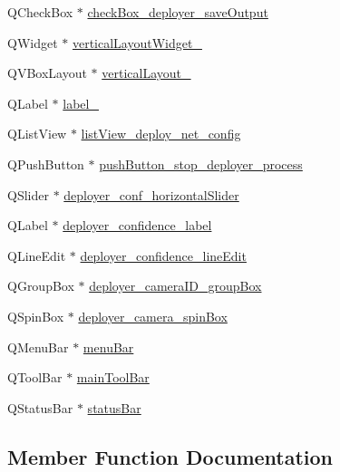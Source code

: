 \begin{DoxyCompactItemize}
\item 
Q\+Check\+Box $\ast$ \hyperlink{class_ui___main_window_ae6738983e603f6ea1c7b78bb235f21f4}{check\+Box\+\_\+deployer\+\_\+save\+Output}
\item 
Q\+Widget $\ast$ \hyperlink{class_ui___main_window_a507148e07a2601e871a3c271652f0ee6}{vertical\+Layout\+Widget\+\_}
\item 
Q\+V\+Box\+Layout $\ast$ \hyperlink{class_ui___main_window_aec98c1da19ec397f73ccd25251806b18}{vertical\+Layout\+\_}
\item 
Q\+Label $\ast$ \hyperlink{class_ui___main_window_a438102703ff7e65b133ba3760663d554}{label\+\_}
\item 
Q\+List\+View $\ast$ \hyperlink{class_ui___main_window_a5acb60bba22ded15cd9bfca7535091cb}{list\+View\+\_\+deploy\+\_\+net\+\_\+config}
\item 
Q\+Push\+Button $\ast$ \hyperlink{class_ui___main_window_a79e9fa8f83ebfda559d73855a2f17967}{push\+Button\+\_\+stop\+\_\+deployer\+\_\+process}
\item 
Q\+Slider $\ast$ \hyperlink{class_ui___main_window_a2cc4bbc3a3be8d809cd21e6976ce7550}{deployer\+\_\+conf\+\_\+horizontal\+Slider}
\item 
Q\+Label $\ast$ \hyperlink{class_ui___main_window_a4491c31fb00cdbf28bf327f7c3ba1c5d}{deployer\+\_\+confidence\+\_\+label}
\item 
Q\+Line\+Edit $\ast$ \hyperlink{class_ui___main_window_ab175e6315d05d53b89ad808af07ab7f0}{deployer\+\_\+confidence\+\_\+line\+Edit}
\item 
Q\+Group\+Box $\ast$ \hyperlink{class_ui___main_window_ae6d2a52e53058aad813e5bc4a526b7f8}{deployer\+\_\+camera\+I\+D\+\_\+group\+Box}
\item 
Q\+Spin\+Box $\ast$ \hyperlink{class_ui___main_window_a65d87f1e7f974ce78eb7950faaa38913}{deployer\+\_\+camera\+\_\+spin\+Box}
\item 
Q\+Menu\+Bar $\ast$ \hyperlink{class_ui___main_window_a2be1c24ec9adfca18e1dcc951931457f}{menu\+Bar}
\item 
Q\+Tool\+Bar $\ast$ \hyperlink{class_ui___main_window_a5172877001c8c7b4e0f6de50421867d1}{main\+Tool\+Bar}
\item 
Q\+Status\+Bar $\ast$ \hyperlink{class_ui___main_window_a50fa481337604bcc8bf68de18ab16ecd}{status\+Bar}
\end{DoxyCompactItemize}


\subsection{Member Function Documentation}
\mbox{\label{class_ui___main_window_a097dd160c3534a204904cb374412c618}} 
